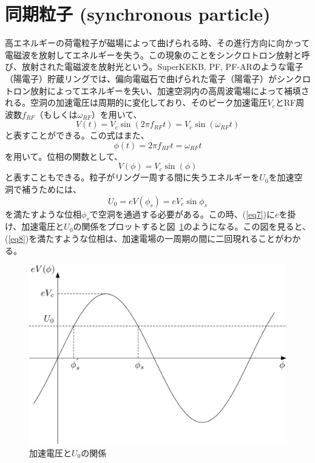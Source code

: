 \documentclass[10pt,a4paper]{ltjsarticle}
\begin{document}
\section{同期粒子 (synchronous particle)}
高エネルギーの荷電粒子が磁場によって曲げられる時、その進行方向に向かって電磁波を放射してエネルギーを失う。この現象のことをシンクロトロン放射と呼び、放射された電磁波を放射光という。SuperKEKB, PF, PF-ARのような電子（陽電子）貯蔵リングでは、偏向電磁石で曲げられた電子（陽電子）がシンクロトロン放射によってエネルギーを失い、加速空洞内の高周波電場によって補填される。空洞の加速電圧は周期的に変化しており、そのピーク加速電圧$V_c$とRF周波数$f_{RF}$（もしくは$\omega_{RF}$）を用いて、
%
\begin{equation}
  V(t) = V_c\sin\left(2\pi f_{RF} t\right)=V_c\sin(\omega_{RF} t)
  \label{vc}
\end{equation}
%
と表すことができる。この式はまた、
%
\begin{equation}
  \phi(t) = 2\pi f_{RF} t=\omega_{RF} t
  \label{phase}
\end{equation}
%
を用いて。位相\phi の関数として、
%
\begin{equation}
  V\left(\phi\right) = V_c\sin(\phi)
  \label{eq7}
\end{equation}
%
と表すこともできる。粒子がリング一周する間に失うエネルギーを$U_0$を加速空洞で補うためには、
%
\begin{equation}
  U_0=e V\left(\phi_s\right)=e V_c \sin\phi_s
  \label{eq8}
\end{equation}
%
を満たすような位相$\phi_s$で空洞を通過する必要がある。この時、(\ref{eq7})に$e$を掛け、加速電圧と$U_0$の関係をプロットすると図~\ref{cavity_vol}のようになる。この図を見ると、(\ref{eq8})を満たすような位相は、加速電場の一周期の間に二回現れることがわかる。

\begin{figure}[hbt]
  \begin{center}
    \includegraphics[width=12cm,clip]{cavity_vol.pdf}
    \caption{加速電圧と$U_0$の関係}
   \label{cavity_vol}
  \end{center}
\end{figure}
\end{document}
